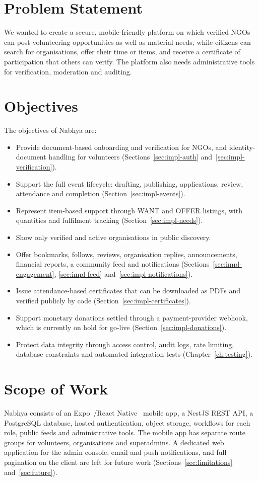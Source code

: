 \section{Problem Statement}
We wanted to create a secure, mobile-friendly platform on which verified NGOs can post volunteering opportunities as well as material needs, while citizens can search for organisations, offer their time or items, and receive a certificate of participation that others can verify. The platform also needs administrative tools for verification, moderation and auditing.

\section{Objectives}
The objectives of Nabhya are:
\begin{itemize}
  \item Provide document-based onboarding and verification for NGOs, and identity-document handling for volunteers (Sections~\ref{sec:impl-auth} and~\ref{sec:impl-verification}).
  \item Support the full event lifecycle: drafting, publishing, applications, review, attendance and completion (Section~\ref{sec:impl-events}).
  \item Represent item-based support through WANT and OFFER listings, with quantities and fulfilment tracking (Section~\ref{sec:impl-needs}).
  \item Show only verified and active organisations in public discovery.
  \item Offer bookmarks, follows, reviews, organisation replies, announcements, financial reports, a community feed and notifications (Sections~\ref{sec:impl-engagement}, \ref{sec:impl-feed} and~\ref{sec:impl-notifications}).
  \item Issue attendance-based certificates that can be downloaded as PDFs and verified publicly by code (Section~\ref{sec:impl-certificates}).
  \item Support monetary donations settled through a payment-provider webhook, which is currently on hold for go-live (Section~\ref{sec:impl-donations}).
  \item Protect data integrity through access control, audit logs, rate limiting, database constraints and automated integration tests (Chapter~\ref{ch:testing}).
\end{itemize}

\section{Scope of Work}
Nabhya consists of an Expo~\cite{expo}/React Native~\cite{reactnative} mobile app, a NestJS REST API, a PostgreSQL database, hosted authentication, object storage, workflows for each role, public feeds and administrative tools. The mobile app has separate route groups for volunteers, organisations and superadmins. A dedicated web application for the admin console, email and push notifications, and full pagination on the client are left for future work (Sections~\ref{sec:limitations} and~\ref{sec:future}).

